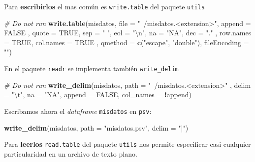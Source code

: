 \documentclass[]{article}
\newenvironment{Shaded}{\begin{snugshade}}{\end{snugshade}}
\newcommand{\KeywordTok}[1]{\textcolor[rgb]{0.13,0.29,0.53}{\textbf{#1}}}
\newcommand{\DataTypeTok}[1]{\textcolor[rgb]{0.13,0.29,0.53}{#1}}
\newcommand{\CharTok}[1]{\textcolor[rgb]{0.31,0.60,0.02}{#1}}
\newcommand{\StringTok}[1]{\textcolor[rgb]{0.31,0.60,0.02}{#1}}
\newcommand{\CommentTok}[1]{\textcolor[rgb]{0.56,0.35,0.01}{\textit{#1}}}
\newcommand{\OtherTok}[1]{\textcolor[rgb]{0.56,0.35,0.01}{#1}}
\newcommand{\OperatorTok}[1]{\textcolor[rgb]{0.81,0.36,0.00}{\textbf{#1}}}
\newcommand{\NormalTok}[1]{#1}
\begin{document}
Para \textbf{escribirlos} el mas común es \texttt{write.table} del
paquete \texttt{utils} \parencite{utils}

\begin{Shaded}
\begin{Highlighting}[]
\CommentTok{# Do not run}
\KeywordTok{write.table}\NormalTok{(misdatos, }\DataTypeTok{file =} \StringTok{"~/misdatos.<extension>"}\NormalTok{, }\DataTypeTok{append =} \OtherTok{FALSE}
\NormalTok{, }\DataTypeTok{quote =} \OtherTok{TRUE}\NormalTok{, }\DataTypeTok{sep =} \StringTok{" "}\NormalTok{, }\DataTypeTok{eol =} \StringTok{"}\CharTok{\textbackslash{}n}\StringTok{"}\NormalTok{, }\DataTypeTok{na =} \StringTok{"NA"}\NormalTok{, }\DataTypeTok{dec =} \StringTok{"."}
\NormalTok{, }\DataTypeTok{row.names =} \OtherTok{TRUE}\NormalTok{, }\DataTypeTok{col.names =} \OtherTok{TRUE}
\NormalTok{, }\DataTypeTok{qmethod =} \KeywordTok{c}\NormalTok{(}\StringTok{"escape"}\NormalTok{, }\StringTok{"double"}\NormalTok{), }\DataTypeTok{fileEncoding =} \StringTok{""}\NormalTok{)}
\end{Highlighting}
\end{Shaded}

En el paquete \texttt{readr} se implementa también \texttt{write\_delim}

\begin{Shaded}
\begin{Highlighting}[]
\CommentTok{# Do not run}
\KeywordTok{write_delim}\NormalTok{(misdatos, }\DataTypeTok{path =} \StringTok{"~/misdatos.<extension>"}
\NormalTok{            , }\DataTypeTok{delim =} \StringTok{"}\CharTok{\textbackslash{}t}\StringTok{"}\NormalTok{, }\DataTypeTok{na =} \StringTok{"NA"}\NormalTok{, }\DataTypeTok{append =} \OtherTok{FALSE}\NormalTok{, }\DataTypeTok{col_names =} \OperatorTok{!}\NormalTok{append)}
\end{Highlighting}
\end{Shaded}

Escribamos ahora el \emph{dataframe} \texttt{misdatos} en \texttt{psv}:

\begin{Shaded}
\begin{Highlighting}[]
\KeywordTok{write_delim}\NormalTok{(misdatos, }\DataTypeTok{path =} \StringTok{"misdatos.psv"}\NormalTok{, }\DataTypeTok{delim =} \StringTok{"|"}\NormalTok{)}
\end{Highlighting}
\end{Shaded}

Para \textbf{leerlos} \texttt{read.table} del paquete \texttt{utils}
\parencite{utils} nos permite especificar casi cualquier particularidad
en un archivo de texto plano.
\end{document}
